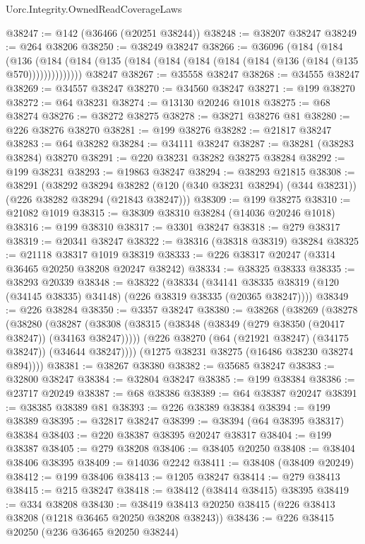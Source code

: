 \begin{lexlean}{Uorc.Integrity.OwnedReadCoverageLaws}
\begin{coremodule}
@38247 := @142 (@36466 (@20251 @38244))
@38248 := @38207 @38247
@38249 := @264 @38206
@38250 := @38249 @38247
@38266 := @36096
    (@184
      (@184
        (@136 (@184 (@184 (@135 (@184 (@184 (@184 (@184 (@184 (@136 (@184 (@135 @570))))))))))))))
    @38247
@38267 := @35558 @38247
@38268 := @34555 @38247
@38269 := @34557 @38247
@38270 := @34560 @38247
@38271 := @199 @38270
@38272 := @64 @38231
@38274 := @13130 @20246 @1018
@38275 := @68 @38274
@38276 := @38272 @38275
@38278 := @38271 @38276 @81
@38280 := @226 @38276 @38270
@38281 := @199 @38276
@38282 := @21817 @38247
@38283 := @64 @38282
@38284 := @34111 @38247
@38287 := @38281 (@38283 @38284) @38270
@38291 := @220 @38231 @38282 @38275 @38284
@38292 := @199 @38231
@38293 := @19863 @38247
@38294 := @38293 @21815
@38308 := @38291
    (@38292
      @38294
      @38282
      (@120 (@340 @38231 @38294) (@344 @38231))
      (@226 @38282 @38294 (@21843 @38247)))
@38309 := @199 @38275
@38310 := @21082 @1019
@38315 := @38309 @38310 @38284 (@14036 @20246 @1018)
@38316 := @199 @38310
@38317 := @3301 @38247
@38318 := @279 @38317
@38319 := @20341 @38247
@38322 := @38316 (@38318 @38319) @38284
@38325 := @21118 @38317 @1019 @38319
@38333 := @226 @38317 @20247 (@3314 @36465 @20250 @38208 @20247 @38242)
@38334 := @38325 @38333
@38335 := @38293 @20339
@38348 := @38322
    (@38334
      (@34141 @38335 @38319 (@120 (@34145 @38335) @34148) (@226 @38319 @38335 (@20365 @38247))))
@38349 := @226 @38284
@38350 := @3357 @38247
@38380 := @38268
    (@38269
      (@38278
        (@38280
          (@38287
            (@38308 (@38315 (@38348 (@38349 (@279 @38350 (@20417 @38247)) (@34163 @38247)))))
            (@226 @38270 (@64 (@21921 @38247) (@34175 @38247)) (@34644 @38247))))
        (@1275 @38231 @38275 (@16486 @38230 @38274 @894))))
@38381 := @38267 @38380
@38382 := @35685 @38247
@38383 := @32800 @38247
@38384 := @32804 @38247
@38385 := @199 @38384
@38386 := @23717 @20249
@38387 := @68 @38386
@38389 := @64 @38387 @20247
@38391 := @38385 @38389 @81
@38393 := @226 @38389 @38384
@38394 := @199 @38389
@38395 := @32817 @38247
@38399 := @38394 (@64 @38395 @38317) @38384
@38403 := @220 @38387 @38395 @20247 @38317
@38404 := @199 @38387
@38405 := @279 @38208
@38406 := @38405 @20250
@38408 := @38404 @38406 @38395
@38409 := @14036 @2242
@38411 := @38408 (@38409 @20249)
@38412 := @199 @38406
@38413 := @1205 @38247
@38414 := @279 @38413
@38415 := @215 @38247
@38418 := @38412 (@38414 @38415) @38395
@38419 := @334 @38208
@38430 := @38419 @38413 @20250 @38415 (@226 @38413 @38208 (@1218 @36465 @20250 @38208 @38243))
@38436 := @226 @38415 @20250 (@236 @36465 @20250 @38244)

\end{coremodule}
\end{lexlean}
